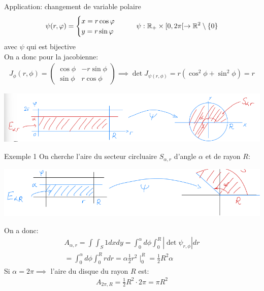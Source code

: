 

\begin{parag}{Application: changement de variable polaire}
    \begin{align*} \psi \left(r, \phi\right) =  
        \begin{cases}
            x =  r \cos \phi\\
            y =  r \sin \phi
        \end{cases} \mathspace \mathspace \psi : \mathbb{R}_+ \times [ 0, 2\pi [ \to \mathbb{R}^{2} \setminus \left\{0\right\}
    \end{align*}
    avec $\psi$ qui est bijective\\
        On a donc pour la jacobienne:
        \begin{align*}
            J_{\phi}\left(r, \phi\right) =  \begin{pmatrix} \cos \phi & -r\sin \phi \\ \sin\phi & r\cos\phi \end{pmatrix}  \implies \det J_{\psi \left(r, \phi\right)} =  r \left(\cos^2\phi + \sin^2\phi\right) =  r
        \end{align*}

    \begin{center}
        \includegraphics[scale=0.7]{12025-05-21.png}
    \end{center}
\end{parag}
\begin{parag}{Exemple 1}
    On cherche l'aire du secteur circluaire $S_{\alpha, r}$ d'angle $\alpha$ et de rayon $R$:
    \begin{center}
        \includegraphics[scale=0-7]{22025-05-21.png}
    \end{center}
    On a donc:
    \begin{align*} A_{\alpha, r} =  \int\int_S 1 dxdy =  \int_0^\alpha d\phi \int_0^R \left| \det \psi_{r, \phi}\right|dr\\
        = \int_0^\alpha d\phi \int_0^R r dr =  \alpha \frac{1}{2} r^2\mid_0^R =  \frac{1}{2}R^2 \alpha
    \end{align*}
    Si $\alpha = 2\pi \implies $ l'aire du disque du rayon $R$ est:
    \begin{align*} A_{2\pi, R} =  \frac{1}{2} R^2 \cdot  2\pi =  \pi R^2 \end{align*}
    
\end{parag}
